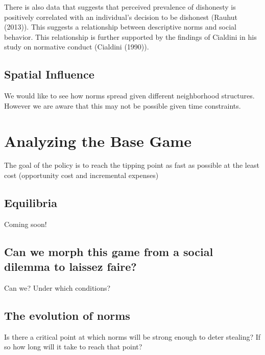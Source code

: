 \documentclass{article}
\begin{document}
There is also data that suggests that perceived prevalence of dishonesty is positively correlated with an individual's decision to be dishonest (Rauhut (2013)). This suggests a relationship between descriptive norms and social behavior. This relationship is further supported by the findings of Cialdini in his study on normative conduct (Cialdini (1990)).

\subsection{Spatial Influence}  
We would like to see how norms spread given different neighborhood structures. However we are aware that this may not be possible given time constraints. 
\section{Analyzing the Base Game}                                                                                                  
The goal of the policy is to reach the tipping point as fast as possible at the least cost (opportunity cost and incremental expenses)
\subsection{Equilibria}
Coming soon!
\subsection{Can we morph this game from a social dilemma to laissez faire?}
Can we? Under which conditions?

\subsection{The evolution of norms}
Is there a critical point at which norms will be strong enough to deter stealing? If so how long will it take to reach that point? 
\end{document}
